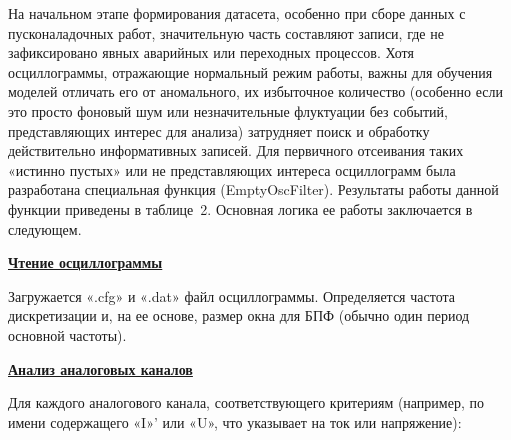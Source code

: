 


На начальном этапе формирования датасета, особенно при сборе данных с пусконаладочных
работ, значительную часть составляют записи, где не зафиксировано явных аварийных или
переходных процессов. Хотя осциллограммы, отражающие нормальный режим работы, важны для
обучения моделей отличать его от аномального, их избыточное количество (особенно если
это просто фоновый шум или незначительные флуктуации без событий, представляющих интерес
для анализа) затрудняет поиск и обработку действительно информативных записей. Для
первичного отсеивания таких «истинно пустых» или не представляющих интереса осциллограмм
была разработана специальная функция (EmptyOscFilter). Результаты работы данной функции
приведены в таблице~2. Основная логика ее работы заключается в следующем.

\noindent\textbf{\underline{Чтение осциллограммы}}\par\vspace{0.1cm}

Загружается «.cfg» и «.dat» файл осциллограммы. Определяется частота дискретизации и, на
ее основе, размер окна для БПФ (обычно один период основной частоты).

\noindent\textbf{\underline{Анализ аналоговых каналов}}\par\vspace{0.1cm}

Для каждого аналогового канала, соответствующего критериям (например, по имени
содержащего «I»' или «U», что указывает на ток или напряжение):

